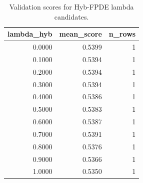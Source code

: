 \begin{table}[t]
\caption{Validation scores for Hyb-FPDE lambda candidates.}
\label{tab:lambda_distribution_computed}
\centering
\begin{tabular}{rrr}
\toprule
lambda\_hyb & mean\_score & n\_rows \\
\midrule
0.0000 & 0.5399 & 1 \\
0.1000 & 0.5394 & 1 \\
0.2000 & 0.5394 & 1 \\
0.3000 & 0.5394 & 1 \\
0.4000 & 0.5386 & 1 \\
0.5000 & 0.5383 & 1 \\
0.6000 & 0.5387 & 1 \\
0.7000 & 0.5391 & 1 \\
0.8000 & 0.5376 & 1 \\
0.9000 & 0.5366 & 1 \\
1.0000 & 0.5350 & 1 \\
\bottomrule
\end{tabular}

\end{table}
